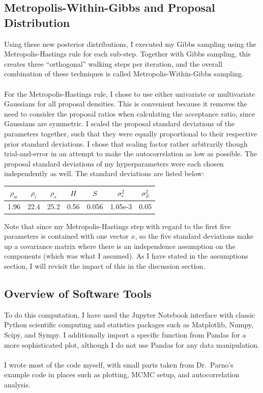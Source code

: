 \documentclass[12pt, letterpaper]{article}
\begin{document}
\subsection{Metropolis-Within-Gibbs and Proposal Distribution}
Using these new posterior distributions, I executed my Gibbs sampling using the Metropolis-Hastings rule for each sub-step.
Together with Gibbs sampling, this creates three ``orthogonal'' walking steps per iteration, and the overall combination of these
techniques is called Metropolis-Within-Gibbs sampling.
\\\\
For the Metropolis-Hastings rule, I chose to use either univariate or multivariate Gaussians for all proposal densities.
This is convenient because it removes the need to consider the proposal ratios when calculating the acceptance ratio,
since Gaussians are symmetric. I scaled the proposal standard deviations of the parameters together,
such that they were equally proportional to their respective prior standard deviations. I chose that scaling factor
rather arbitrarily though trial-and-error in an attempt to make the autocorrelation as low as possible.
The proposal standard deviations of my hyperparameters were each chosen independently as well.
The standard deviations are listed below:
\medskip
\begin{center}
\begin{tabular} { |c|c|c|c|c|c|c| }

\hline
$\rho_w$ & $\rho_i $& $\rho_s$ & $H$ & $S$ & $\sigma^2_\epsilon$ & $\sigma^2_S$ \\
\hline
1.96     & 22.4     & 25.2     &0.56 &0.056&    1.05e-3          & 0.05         \\
\hline

\end{tabular}
\end{center}
\medskip
Note that since my Metropolis-Hastings step with regard to the first five parameters is contained with one vector $x$,
so the five standard deviations make up a covariance matrix where there is an independence assumption on the components
(which was what I assumed). As I have stated in the assumptions section, I will revisit the impact of this in the discussion section.


\subsection{Overview of Software Tools}
To do this computation, I have used the Jupyter Notebook interface with classic Python scientific computing and statistics packages
such as Matplotlib, Numpy, Scipy, and Sympy. I additionally import a specific function from Pandas for a more sophisticated plot,
although I do not use Pandas for any data manipulation.
\\\\
I wrote most of the code myself, with small parts taken from Dr.\ Parno's example code in places such as plotting, MCMC setup,
and autocorrelation analysis.
\end{document}
